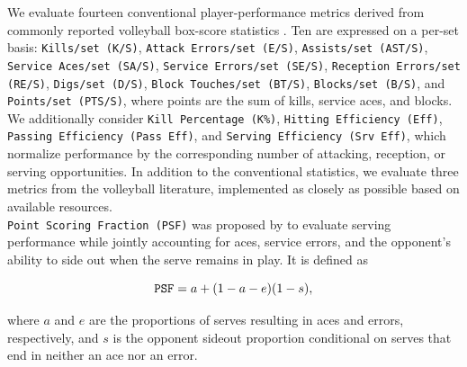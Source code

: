 \documentclass[10pt]{article}
\begin{document}
We evaluate fourteen conventional player-performance metrics derived from commonly reported volleyball box-score statistics \citep{major_league_volleyball_statistics_2024}.
Ten are expressed on a per-set basis: \texttt{Kills/set (K/S)}, \texttt{Attack Errors/set (E/S)}, \texttt{Assists/set (AST/S)}, \texttt{Service Aces/set (SA/S)}, \texttt{Service Errors/set (SE/S)}, \texttt{Reception Errors/set (RE/S)}, \texttt{Digs/set (D/S)}, \texttt{Block Touches/set (BT/S)}, \texttt{Blocks/set (B/S)}, and \texttt{Points/set (PTS/S)}, where points are the sum of kills, service aces, and blocks.
We additionally consider \texttt{Kill Percentage (K\%)}, \texttt{Hitting Efficiency (Eff)}, \texttt{Passing Efficiency (Pass Eff)}, and \texttt{Serving Efficiency (Srv Eff)}, which normalize performance by the corresponding number of attacking, reception, or serving opportunities.
In addition to the conventional statistics, we evaluate three metrics from the volleyball literature, implemented as closely as possible based on available resources. \\

\texttt{Point Scoring Fraction (PSF)} was proposed by \citet{burton_linear_2015} to evaluate serving performance while jointly accounting for aces, service errors, and the opponent's ability to side out when the serve remains in play.
It is defined as

\[
\text{\texttt{PSF}}
=
a+(1-a-e)(1-s),
\]

where $a$ and $e$ are the proportions of serves resulting in aces and errors, respectively, and $s$ is the opponent sideout proportion conditional on serves that end in neither an ace nor an error. \\
\end{document}
